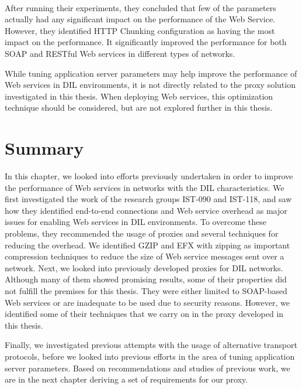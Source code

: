 \paragraph{}

After running their experiments, they concluded that few of the parameters
actually had any significant impact on the performance of the Web Service.
However, they identified HTTP Chunking configuration as having the most impact
on the performance. It significantly improved the performance for both SOAP and
RESTful Web services in different types of networks.

While tuning application server parameters may help improve the performance of
Web services in DIL environments, it is not directly related to the proxy
solution investigated in this thesis. When deploying Web services, this
optimization technique should be considered, but are not explored further in
this thesis.


\section{Summary}

In this chapter, we looked into efforts previously undertaken in order to
improve the performance of Web services in networks with the DIL
characteristics. We first investigated the work of the research groups IST-090
and IST-118, and saw how they identified end-to-end connections and Web service
overhead as major issues for enabling Web services in DIL environments. To
overcome these problems, they recommended the usage of proxies and several
techniques for reducing the overhead. We identified GZIP and EFX with zipping as
important compression techniques to reduce the size of Web service messages sent
over a network. Next, we looked into previously developed proxies for DIL
networks. Although many of them showed promising results, some of their
properties did not fulfill the premises for this thesis. They were either
limited to SOAP-based Web services or are inadequate to be used due to security
reasons. However, we identified some of their techniques that we carry on in the
proxy developed in this thesis.

Finally, we investigated previous attempts with the usage of alternative
transport protocols, before we looked into previous efforts in the area of
tuning application server parameters. Based on recommendations and studies of
previous work, we are in the next chapter deriving a set of requirements for our
proxy.
